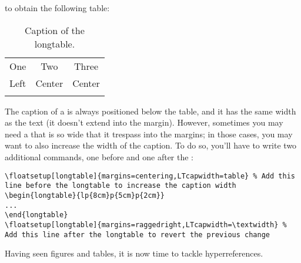 to obtain the following table:
\begin{longtable}{|l c c|}
    \hline
    One & Two & Three \\
    Left & Center & Center \\
    \hline
    \caption{Caption of the longtable.}
\end{longtable}

The caption of a  is always positioned below the
table, and it has the same width as the text (it doesn't extend into the
margin). However, sometimes you may need a  that
is so wide that it trespass into the margins; in those cases, you may
want to also increase the width of the caption. To do so, you'll have to
write two additional commands, one before and one after the
:

\begin{lstlisting}[caption=Increasing the width of the caption of a \Environment{longtable}.]
\floatsetup[longtable]{margins=centering,LTcapwidth=table} % Add this line before the longtable to increase the caption width
\begin{longtable}{lp{8cm}p{5cm}p{2cm}}
...
\end{longtable}
\floatsetup[longtable]{margins=raggedright,LTcapwidth=\textwidth} % Add this line after the longtable to revert the previous change
\end{lstlisting}

Having seen figures and tables, it is now time to tackle
hyperreferences.
